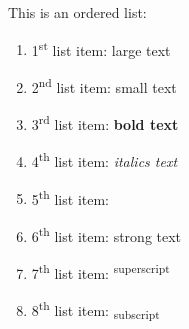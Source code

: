 \documentclass[12pt]{article}
\begin{document}
This is an ordered list:


\begin{enumerate}

    \item 1\textsuperscript{st} list item: \Large{large text}

    \item 2\textsuperscript{nd} list item: \scriptsize{small text}

    \item 3\textsuperscript{rd} list item: \textbf{bold text}

    \item 4\textsuperscript{th} list item: \textit{italics text}

    \item 5\textsuperscript{th} list item: 

    \item 6\textsuperscript{th} list item: \textmd{strong text}

    \item 7\textsuperscript{th} list item: \textsuperscript{superscript}

    \item 8\textsuperscript{th} list item: \textsubscript{subscript}

\end{enumerate}
\end{document}
